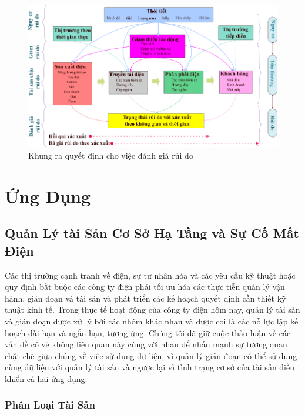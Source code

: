 \documentclass[utf8]{frontiersSCNS} %
\begin{document}
\begin{figure}[h!]
	\centering
	\begin{center}
		\includegraphics[width=\textwidth]{decisionmaking-risk}%
	\end{center}
	\caption{Khung ra quyết định cho việc đánh giá rủi do}\label{fig:3}
\end{figure}

\section{Ứng Dụng}
\subsection{Quản Lý tài Sản Cơ Sở Hạ Tầng và Sự Cố Mất Điện}
Các thị trường cạnh tranh về điện, sự tư nhân hóa và các yêu cầu kỹ thuật hoặc quy định bắt buộc các công ty điện phải tối ưu hóa các thực tiễn quản lý vận hành, gián đoạn và tài sản và phát triển các kế hoạch quyết định cần thiết kỹ thuật kinh tế. Trong thực tế hoạt động của công ty điện hôm nay, quản lý tài sản và gián đoạn được xử lý bởi các nhóm khác nhau và được coi là các nỗ lực lập kế hoạch dài hạn và ngắn hạn, tương ứng. Chúng tôi đã giữ cuộc thảo luận về các vấn đề có vẻ không liên quan này cùng với nhau để nhấn mạnh sự tương quan chặt chẽ giữa chúng về việc sử dụng dữ liệu, vì quản lý gián đoạn có thể sử dụng cùng dữ liệu với quản lý tài sản và ngược lại vì tình trạng cơ sở của tài sản điều khiển cả hai ứng dụng:

\subsubsection{Phân Loại Tài Sản} 
\end{document}
